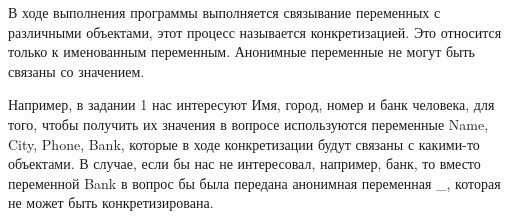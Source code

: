 \documentclass[a4paper,12pt]{article}
\begin{document}
В ходе выполнения программы выполняется связывание переменных с различными объектами, этот процесс называется конкретизацией. Это относится только к именованным переменным. Анонимные переменные не могут быть связаны со значением.

Например, в задании 1 нас интересуют Имя, город, номер и банк человека, для того, чтобы получить их значения в вопросе используются переменные Name, City, Phone, Bank, которые в ходе конкретизации будут связаны с какими-то объектами. В случае, если бы нас не интересовал, например, банк, то вместо переменной Bank в вопрос бы была передана анонимная переменная \_, которая не может быть конкретизирована.
\end{document}
